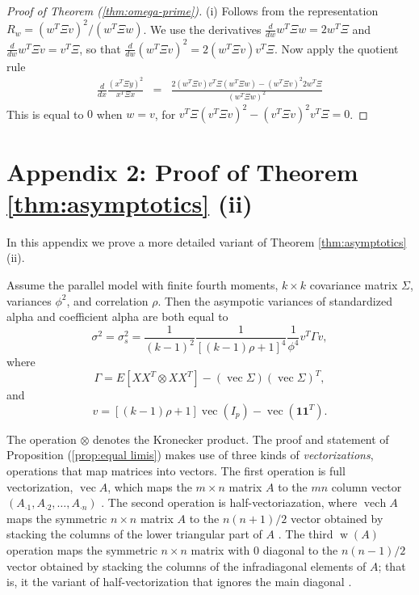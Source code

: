 \documentclass[twoside]{article}
\DeclareMathOperator{\vvec}{vec}
\DeclareMathOperator{\vech}{vech}
\DeclareMathOperator{\w}{w}
\begin{document}
\begin{proof}[Proof of Theorem (\ref{thm:omega-prime})]
(i) Follows from the representation $R_w = (w^T\Xi v)^2/(w^T\Xi w)$. We use the derivatives $\frac{d}{dw}w^{T}\Xi w=2w^{T}\Xi$ and $\frac{d}{dw}w^{T}\Xi v=v^{T}\Xi$,
so that $\frac{d}{dw}(w^{T}\Xi v)^{2}=2(w^{T}\Xi v)v^{T}\Xi$. Now
apply the quotient rule
\begin{eqnarray*}
\frac{d}{dx}\frac{(x^{T}\Xi y)^{2}}{x^{T}\Xi x} & = & \frac{2(w^{T}\Xi v)v^{T}\Xi(w^{T}\Xi w)-(w^{T}\Xi v)^{2}2w^{T}\Xi}{(w^{T}\Xi w)^{2}}
\end{eqnarray*}
This is equal to $0$ when $w=v$, for $v^{T}\Xi(v^{T}\Xi v)^{2}-(v^{T}\Xi v)^{2}v^{T}\Xi=0$.
\end{proof}
\section*{Appendix 2: Proof of Theorem \ref{thm:asymptotics} (ii)}
\label{Appendix 2}

In this appendix we prove a more detailed variant of Theorem \ref{thm:asymptotics} (ii).
\begin{prop}
\label{prop:equal limis}Assume the parallel model with finite fourth
moments, $k\times k$ covariance matrix $\Sigma$, variances $\phi^{2}$,
and correlation $\rho$. Then the asympotic variances of standardized
alpha and coefficient alpha are both equal to 
\begin{equation}
\sigma^{2}=\sigma_{s}^{2}=\frac{1}{(k-1)^{2}}\frac{1}{[(k-1)\rho+1]^{4}}\frac{1}{\phi^{4}}v^{T}\Gamma v,\label{eq:asymptotic variance-1}
\end{equation}
where 
\begin{equation}
\nonumber
\Gamma = E[XX^{T}\otimes XX^{T}]-(\vvec\Sigma)(\vvec\Sigma)^{T},
\end{equation}
 and
\[
v=[(k-1)\rho+1]\vvec(I_{p})-\vvec(\boldsymbol{1}\boldsymbol{1}^{T}).
\]
\end{prop}

The operation $\otimes$ denotes the Kronecker product. The proof and statement of Proposition (\ref{prop:equal limis}) makes use of three
kinds of \emph{vectorizations}, operations that map matrices into
vectors. The first operation is full vectorization, $\vvec A$, which
maps the $m\times n$ matrix $A$ to the $mn$ column vector $(A_{\cdot1},A_{\cdot2},\ldots,A_{\cdot n})$
\citep[Chapter 2.4]{Magnus2019-cz}. The second operation is half-vectoriazation,
where $\vech A$ maps the symmetric $n\times n$ matrix $A$ to the
$n(n+1)/2$ vector obtained by stacking the columns of the lower triangular
part of $A$ \citep[Chapter 3.8]{Magnus2019-cz}. The third $\w(A)$
operation maps the symmetric $n\times n$ matrix with $0$ diagonal
to the $n(n-1)/2$ vector obtained by stacking the columns of the
infradiagonal elements of $A$; that is, it the variant of half-vectorization
that ignores the main diagonal \citep{Neudecker1996-fu}. 
\end{document}
